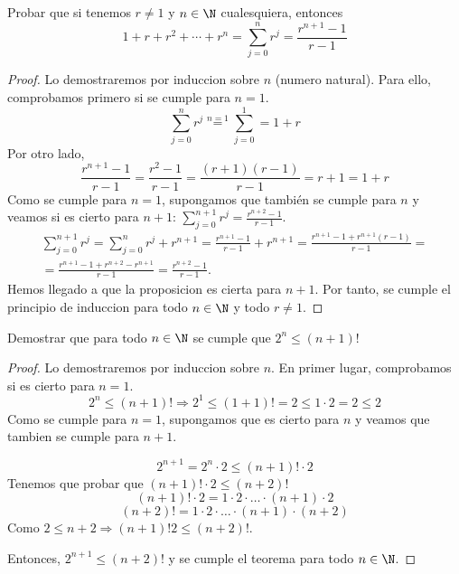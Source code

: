 \begin{example}
	Probar que si tenemos \(r \neq  1 \) y \(n \in  \N  \) cualesquiera, entonces
	\[
		1 + r + r^{2} + \cdots + r^{n} = \sum_{j=0}^{n } r^{j}  = \frac{r^{n+1 } - 1 }{r - 1}
	\]
\end{example}
\begin{proof}
	Lo demostraremos por induccion sobre \(n \) (numero natural). Para ello, comprobamos primero si se cumple para \(n = 1\).
	\[
		\sum_{j=0}^{n} r^{j } \overset{n=1}{=} \sum_{j=0}^{1} = 1 + r
	\]
	Por otro lado,
	\[
		\frac{r^{n+1}-1 }{r-1} = \frac{r^{2} - 1 }{r - 1} = \frac{(r+1)(r-1)}{r - 1} = r + 1 = 1 + r
	\]
	Como se cumple para \(n = 1\), supongamos que también se cumple para \(n \) y veamos si es cierto para \(n + 1\): \(\displaystyle \sum_{j=0}^{n+1} r^{j}  = \frac{r^{n+2} - 1 }{r - 1}\).
	\begin{multline*}
		\sum_{j=0}^{n+1} r^{j} = \sum_{j=0}^{n} r^{j} + r^{n+1} = \frac{r^{n+1} -1 }{r-1} + r^{n+1} = \frac{r^{n+1} - 1 + r^{n+1}(r-1)}{r-1} = \\
		= \frac{r^{n+1} - 1 + r^{n+2} - r^{n+1}}{r-1} = \boxed{\frac{r^{n+2} - 1 }{r -1}}.
	\end{multline*}
	Hemos llegado a que la proposicion es cierta para \(n + 1 \). Por tanto, se cumple el principio de induccion para todo \(n \in  \N \) y todo \( r \neq   1\).
\end{proof}

\begin{example}
	Demostrar que para todo \(n \in \N  \) se cumple que \(2^{n} \leq (n+1)! \)
\end{example}
\begin{proof}
	Lo demostraremos por induccion sobre \(n \). En primer lugar, comprobamos si es cierto para \(n = 1 \).
	\[
		2^{n} \leq (n+1)! \Rightarrow 2^{1} \leq (1+1)! = 2 \leq 1 \cdot 2 = 2 \leq 2
	\]
	Como se cumple para \(n = 1 \), supongamos que es cierto para \(n \) y veamos que tambien se cumple para \(n+1 \).

	\[
		2^{n+1} = 2^{n} \cdot 2 \leq (n+1)! \cdot 2
	\]
	Tenemos que probar que \((n+1)! \cdot 2 \leq (n+2)!\)
	\[
		(n+1)! \cdot 2 = 1 \cdot 2 \cdot \ldots \cdot (n+1) \cdot 2
	\]
	\[
		(n+2)! = 1 \cdot 2 \cdot \ldots \cdot (n+1) \cdot (n+2)
	\]
	Como \(2 \leq n +2 \Rightarrow (n+1)! 2 \leq (n+2)!\).

	Entonces, \(2^{n+1} \leq (n+2)! \) y se cumple el teorema para todo \(n \in  \N \).
\end{proof}

